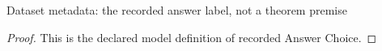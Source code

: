 \begin{definition}
  \label{def:physics:phyx-mini-0049:phyxminiproblems-problemphyxmini0049-recordedanswerchoice}
  Dataset metadata: the recorded answer label, not a theorem premise
\end{definition}
\begin{proof}
  This is the declared model definition of recorded Answer Choice.
\end{proof}
